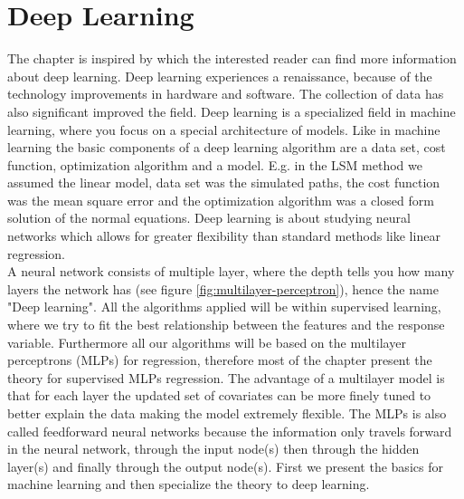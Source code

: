 
\chapter{Deep Learning} %

\label{Chapter4} %

The chapter is inspired by \parencite{Goodfellow-et-al-2016,Mackay18} which the interested reader can find more information about deep learning. Deep learning experiences a renaissance, because of the technology improvements in hardware and software. The collection of data has also significant improved the field. Deep learning is a specialized field in machine learning, where you focus on a special architecture of models. Like in machine learning the basic components of a deep learning algorithm are a data set, cost function, optimization algorithm and a model. E.g. in the LSM method we assumed the linear model, data set was the simulated paths, the cost function was the mean square error and the optimization algorithm was a closed form solution of the normal equations. Deep learning is about studying neural networks which allows for greater flexibility than standard methods like linear regression. \\

A neural network consists of multiple layer, where the depth tells you how many layers the network has (see figure \ref{fig:multilayer-perceptron}), hence the name "Deep learning". All the algorithms applied will be within supervised learning, where we try to fit the best relationship between the features and the response variable. Furthermore all our algorithms will be based on the multilayer perceptrons (MLPs) for regression, therefore most of the chapter present the theory for supervised MLPs regression. The advantage of a multilayer model is that for each layer the updated set of covariates can be more finely tuned to better explain the data making the model extremely flexible. The MLPs is also called feedforward neural networks because the information only travels forward in the neural network, through the input node(s) then through the hidden layer(s) and finally through the output node(s). First we present the basics for machine learning and then specialize the theory to deep learning.


